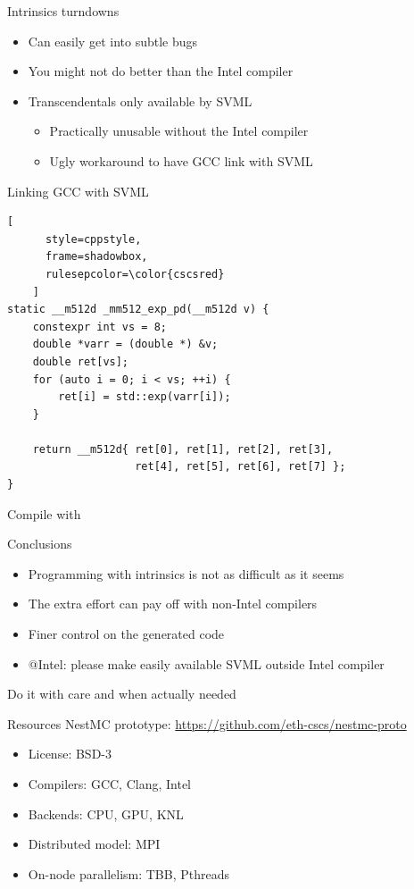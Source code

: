 \documentclass[aspectratio=1610,14pt]{beamer}
\begin{document}
\begin{frame}{Intrinsics turndowns}
  \begin{itemize}
  \item Can easily get into subtle bugs
  \item You might not do better than the Intel compiler
  \item Transcendentals only available by SVML
    \begin{itemize}
    \item Practically unusable without the Intel compiler
    \item Ugly workaround to have GCC link with SVML
    \end{itemize}
  \end{itemize}
\end{frame}

\begin{frame}[fragile]{Linking GCC with SVML}
  \begin{lstlisting}[
      style=cppstyle,
      frame=shadowbox,
      rulesepcolor=\color{cscsred}
    ]
static __m512d _mm512_exp_pd(__m512d v) {
    constexpr int vs = 8;
    double *varr = (double *) &v;
    double ret[vs];
    for (auto i = 0; i < vs; ++i) {
        ret[i] = std::exp(varr[i]);
    }

    return __m512d{ ret[0], ret[1], ret[2], ret[3],
                    ret[4], ret[5], ret[6], ret[7] };
}
\end{lstlisting}
\vfill
Compile with {}
\end{frame}

\begin{frame}{Conclusions}
  \begin{itemize}
  \item Programming with intrinsics is not as difficult as it seems
  \item The extra effort can pay off with non-Intel compilers
  \item Finer control on the generated code
  \item @Intel: please make easily available SVML outside Intel compiler
  \end{itemize}
  \pause
  \begin{center}
  Do it with care and when actually needed
  \end{center}
\end{frame}

\begin{frame}{Resources}
  NestMC prototype: \url{https://github.com/eth-cscs/nestmc-proto}
  \vfill
  \begin{itemize}
  \item License: BSD-3
  \item Compilers: GCC, Clang, Intel
  \item Backends: CPU, GPU, KNL
  \item Distributed model: MPI
  \item On-node parallelism: TBB, Pthreads
  \end{itemize}
\end{frame}

\end{document}
